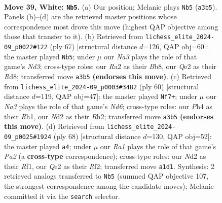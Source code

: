 \documentclass[11pt]{article}
\begin{document}
\begin{figure}[p]
\label{fig:thought-m74}
\end{figure}

\clearpage

\begin{figure}[p]\centering
\begin{subfigure}{0.46\textwidth}\centering
\resizebox{\linewidth}{!}{%
\newchessgame
\chessboard[
  setfen={1rb2r2/p1n2p1k/1pB2Bp1/q2p4/7P/NP4p1/R1PNQP2/R5K1 w - - 0 39},
  showmover=false,
  pgfstyle=straightmove, color=movearrow, markmove={a3-b5}
]}
\caption{}
\end{subfigure}\hfill
\begin{subfigure}{0.46\textwidth}\centering
\resizebox{\linewidth}{!}{%
\newchessgame
\chessboard[
  setfen={1b1r1r1k/1p4pp/p1pn2q1/P7/1Q3P2/5R1P/1P3BP1/3NR2K b - - 22 34},
  showmover=false,
  pgfstyle=straightmove, color=movearrow, markmove={d6-b5}
]}
\caption{}
\end{subfigure}
\\[4pt]
\begin{subfigure}{0.46\textwidth}\centering
\resizebox{\linewidth}{!}{%
\newchessgame
\chessboard[
  setfen={3q1r1k/1p2n1p1/r1pNB2p/p5b1/P1P1PP2/4p1P1/7R/3QK2R w - - 1 31},
  showmover=false,
  pgfstyle=straightmove, color=movearrow, markmove={d6-f7}
]}
\caption{}
\end{subfigure}\hfill
\begin{subfigure}{0.46\textwidth}\centering
\resizebox{\linewidth}{!}{%
\newchessgame
\chessboard[
  setfen={1r3b1k/6pp/1N1pn1r1/1Q1Np3/4Pp2/2P2P1q/PP3R1B/5R1K w - - 1 35},
  showmover=false,
  pgfstyle=straightmove, color=movearrow, markmove={a2-a4}
]}
\caption{}
\end{subfigure}
\caption{\textbf{Move 39, White: \texttt{Nb5}.} (a) Our position; Melanie plays \texttt{Nb5} (\texttt{a3b5}). Panels (b)--(d) are the retrieved master positions whose correspondence most drove this move (highest QAP objective among those that transfer to it). (b) Retrieved from \texttt{lichess\_elite\_2024-09\_p0022\#122} (ply 67) [structural distance $d$=126, QAP obj=60]: the master played \texttt{Nb5}; under $\mu$ our \emph{Na3} plays the role of that game's \emph{Nd3}; cross-type roles: our \emph{R}a2 as their \emph{B}b8, our \emph{Q}e2 as their \emph{R}d8; transferred move \texttt{a3b5} \textbf{(endorses this move)}. (c) Retrieved from \texttt{lichess\_elite\_2024-09\_p0003\#3482} (ply 60) [structural distance $d$=119, QAP obj=47]: the master played \texttt{Nf7+}; under $\mu$ our \emph{Na3} plays the role of that game's \emph{Nd6}; cross-type roles: our \emph{P}h4 as their \emph{R}h1, our \emph{N}d2 as their \emph{R}h2; transferred move \texttt{a3b5} \textbf{(endorses this move)}. (d) Retrieved from \texttt{lichess\_elite\_2024-09\_p0025\#1924} (ply 68) [structural distance $d$=130, QAP obj=52]: the master played \texttt{a4}; under $\mu$ our \emph{Ra1} plays the role of that game's \emph{Pa2} (a \textbf{cross-type} correspondence); cross-type roles: our \emph{N}d2 as their \emph{R}f1, our \emph{Q}e2 as their \emph{R}f2; transferred move \texttt{a1d1}. Synthesis: 2 retrieved analogs transferred to \texttt{Nb5} (summed QAP objective 107, the strongest correspondence among the candidate moves); Melanie committed it via the \texttt{search} selector.}

\end{figure}
\end{document}
